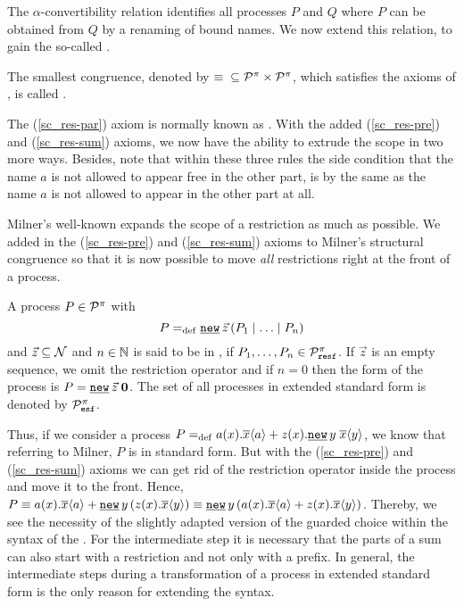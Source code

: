 The $\alpha$-convertibility relation identifies all processes $P$ and $Q$ where $P$ can be obtained from $Q$ by a renaming of bound names. We now extend this relation, to gain the so-called .



\begin{definition}
\label{def_struct_cong}
The smallest congruence, denoted by $\equiv{}{}\subseteq\mathcal P^{\pi}\times\mathcal P^{\pi}$, which satisfies the axioms of , is called .
\end{definition}

The (\ref{sc_res-par}) axiom is normally known as . With the added (\ref{sc_res-pre}) and (\ref{sc_res-sum}) axioms, we now have the ability to extrude the scope in two more ways. Besides, note that within these three rules the side condition that the name $a$ is not allowed to appear free in the other part, is by  the same as the name $a$ is not allowed to appear in the other part at all.

Milner's well-known  \cite{milner} expands the scope of a restriction as much as possible. We added in  the (\ref{sc_res-pre}) and (\ref{sc_res-sum}) axioms to Milner's structural congruence so that it is now possible to move \emph{all} restrictions right at the front of a process.

\begin{definition}
\label{def_extended_standard_form}
A process $P\in\mathcal P^{\pi}$ with
\[P\define\procres[()]{\vec{z}}{\procpar{P_1}{\procpar{\ldots}{P_n}}}\]
and $\vec{z}\subseteq\mathcal N$ and $n\in\mathbb N$ is said to be in , if $P_1,\ldots,P_n\in\mathcal P^{\pi}_{\mathtt{resf}}$. If $\vec{z}$ is an empty sequence, we omit the restriction operator and if $n=0$ then the form of the process is $P=\procres{\vec{z}}{\proczero}$. The set of all processes in extended standard form is denoted by $\mathcal P^{\pi}_{\mathtt{esf}}$.
\end{definition}

Thus, if we consider a process $P\define\procchoice{\inp{a}{x}.\out{x}{a}}{\inp{z}{x}.\procres{y}{\out{x}{y}}}$, we know that referring to Milner, $P$ is in standard form. But with the (\ref{sc_res-pre}) and (\ref{sc_res-sum}) axioms we can get rid of the restriction operator inside the process and move it to the front. Hence, $P\struc\procchoice{\inp{a}{x}.\out{x}{a}}{\procres[()]{y}{\inp{z}{x}.\out{x}{y}}}\struc\procres[()]{y}{\procchoice{\inp{a}{x}.\out{x}{a}}{\inp{z}{x}.\out{x}{y}}}$. Thereby, we see the necessity of the slightly adapted version of the guarded choice within the syntax of the \picalc{}. For the intermediate step it is necessary that the parts of a sum can also start with a restriction and not only with a prefix. In general, the intermediate steps during a transformation of a process in extended standard form is the only reason for extending the syntax.


